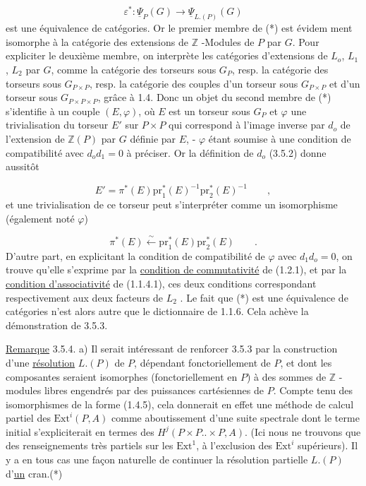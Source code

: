 \begin{equation*}
\varepsilon^* : \underline{\Psi}_P(G) \longrightarrow \underline{\Psi}_{L.(P)}(G)
\end{equation*}
est une équivalence de catégories. Or le premier membre de (*) est évidem
ment isomorphe à la catégorie des extensions de $\mathbb{Z}$ -Modules de $P$ par $G$. Pour expliciter le deuxième membre, on interprète les catégories d'extensions de $L_o$, $L_1$, $L_2$ par $G$, comme la catégorie des torseurs sous $G_P$, resp. la catégorie des torseurs sous $G_{P \times P}$, resp. la catégorie des couples d'un torseur sous $G_{P \times P}$ et d'un torseur sous $G_{P \times P \times P}$, grâce à 1.4. Donc un objet du second membre de (*) s'identifie à un couple $(E,\varphi)$, où $E$ est un torseur sous $G_P$ et $\varphi$ une trivialisation du torseur $E'$ sur $P \times P$ qui correspond à l'image inverse par $d_o$ de l'extension de $\mathbb{Z}(P)$ par $G$ définie par $E$, - $\varphi$ étant soumise à une condition de compatibilité avec $d_o d_1 = 0$ à préciser. Or la définition de $d_o$ (3.5.2) donne aussitôt

\begin{equation*}
E' = \pi^*(E)\mathrm{pr}_1^*(E)^{-1}\mathrm{pr}_2^*(E)^{-1} \qquad ,
\end{equation*}
et une trivialisation de ce torseur peut s'interpréter comme un isomorphisme (également noté $\varphi$)

\begin{equation*}
\pi^*(E) \xleftarrow{\sim} \mathrm{pr}_1^*(E)\mathrm{pr}_2^*(E) \qquad .
\end{equation*}
D'autre part, en explicitant la condition de compatibilité de $\varphi$ avec $d_1 d_o = 0$, on trouve qu'elle s'exprime par la \underline{condition de commutativité} de (1.2.1), et par la \underline{condition d'associativité} de (1.1.4.1), ces deux conditions correspondant respectivement aux deux facteurs de $L_2$ . Le fait que (*) est une équivalence de catégories n'est alors autre que le dictionnaire de 1.1.6. Cela achève la démonstration de 3.5.3.

\underline{Remarque} 3.5.4. a)  Il serait intéressant de renforcer 3.5.3 par la construction d'une \underline{résolution} $L.(P)$ de $P$, dépendant fonctoriellement de $P$, et dont les composantes seraient isomorphes (fonctoriellement en $P$) à des sommes de $\mathbb{Z}$ -modules libres engendrés par des puissances cartésiennes
de $P$. Compte tenu des isomorphismes de la forme (1.4.5), cela donnerait en effet une méthode de calcul partiel des $\mathrm{Ext}^i(P,A)$ comme aboutissement d'une suite spectrale dont le terme  initial s'expliciterait en termes des $H^j(P \times P .. \times P, A)$. (Ici nous ne trouvons que des renseignements très partiels sur les $\mathrm{Ext}^1$, à l'exclusion des $\mathrm{Ext}^i$ supérieurs). Il y a en tous cas une façon naturelle de continuer la résolution partielle $L.(P)$ d'\underline{un} cran.(*)


